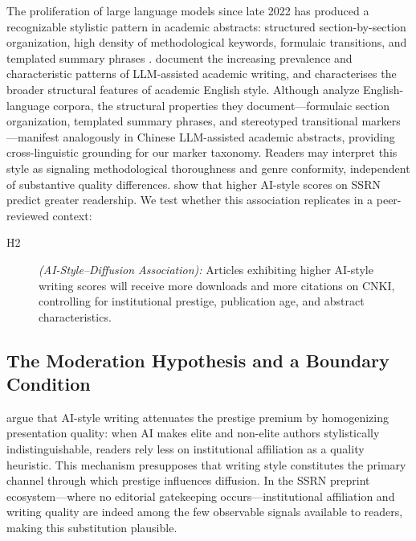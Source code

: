 \documentclass[12pt,a4paper]{article}
\begin{document}
The proliferation of large language models since late 2022 has produced
a recognizable stylistic pattern in academic abstracts: structured
section-by-section organization, high density of methodological keywords,
formulaic transitions, and templated summary phrases
\citep{Liang2024,Biber2016}.
\citet{Liang2024} document the increasing prevalence and characteristic
patterns of LLM-assisted academic writing, and \citet{Biber2016}
characterises the broader structural features of academic English style.
Although \citet{Biber2016} analyze English-language corpora, the
structural properties they document---formulaic section organization,
templated summary phrases, and stereotyped transitional markers---manifest
analogously in Chinese LLM-assisted academic abstracts, providing
cross-linguistic grounding for our marker taxonomy.
Readers may interpret this style as signaling methodological
thoroughness and genre conformity, independent of substantive quality
differences.
\citet{JoLi2026} show that higher AI-style scores on SSRN predict
greater readership.
We test whether this association replicates in a peer-reviewed context:
\begin{description}
  \item[H2] \textit{(AI-Style--Diffusion Association):}
  Articles exhibiting higher AI-style writing scores will receive
  more downloads and more citations on CNKI, controlling for
  institutional prestige, publication age, and abstract
  characteristics.
\end{description}

\subsection{The Moderation Hypothesis and a Boundary Condition}

\citet{JoLi2026} argue that AI-style writing attenuates the prestige
premium by homogenizing presentation quality: when AI makes elite and
non-elite authors stylistically indistinguishable, readers rely less
on institutional affiliation as a quality heuristic.
This mechanism presupposes that writing style constitutes the primary
channel through which prestige influences diffusion.
In the SSRN preprint ecosystem---where no editorial gatekeeping
occurs---institutional affiliation and writing quality are indeed
among the few observable signals available to readers, making this
substitution plausible.
\end{document}
